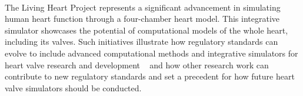 \\
The Living Heart Project represents a significant advancement in simulating human heart function through a four-chamber heart model. This integrative simulator showcases the potential of computational models of the whole heart, including its valves. Such initiatives illustrate how regulatory standards can evolve to include advanced computational methods and integrative simulators for heart valve research and development ~ and how other research work can contribute to new regulatory standards and set a precedent for how future heart valve simulators should be conducted.




